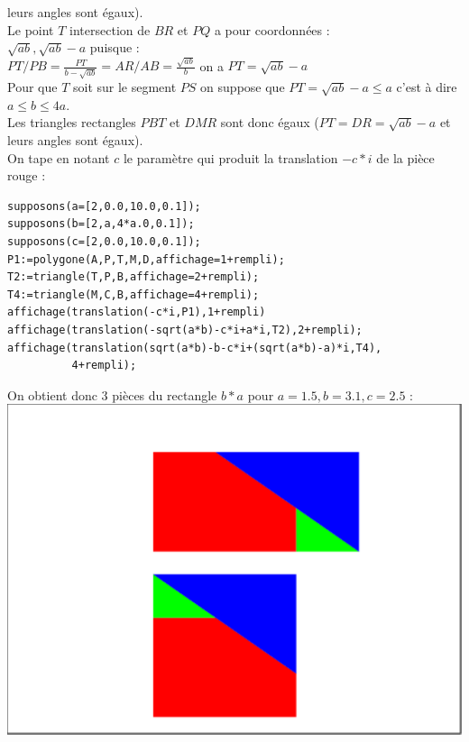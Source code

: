 \documentclass[a4paper,11pt]{book}
\begin{document}
leurs angles sont \'egaux).\\
Le point $T$ intersection de $BR$ et $PQ$ a pour coordonn\'ees :\\
$\sqrt{ab},\sqrt{ab} -a$ puisque :\\
$PT/PB=\frac{PT}{b-\sqrt{ab}}=AR/AB=\frac{\sqrt{ab}}{b}$
on a $PT=\sqrt{ab}-a$\\
Pour que  $T$ soit sur le segment $PS$ on suppose que $PT=\sqrt{ab}-a\leq a$
c'est \`a dire $a\leq b\leq 4a$.\\
Les triangles rectangles $PBT$ et $DMR$ sont donc \'egaux ($PT=DR=\sqrt{ab}-a$ 
et leurs angles sont \'egaux).\\
On tape en notant $c$ le param\`etre qui produit la translation 
$-c*i$ de la pi\`ece rouge :\\
\begin{verbatim}
supposons(a=[2,0.0,10.0,0.1]);
supposons(b=[2,a,4*a.0,0.1]);
supposons(c=[2,0.0,10.0,0.1]);
P1:=polygone(A,P,T,M,D,affichage=1+rempli);
T2:=triangle(T,P,B,affichage=2+rempli);
T4:=triangle(M,C,B,affichage=4+rempli);
affichage(translation(-c*i,P1),1+rempli)
affichage(translation(-sqrt(a*b)-c*i+a*i,T2),2+rempli);
affichage(translation(sqrt(a*b)-b-c*i+(sqrt(a*b)-a)*i,T4),
          4+rempli);
\end{verbatim}
On obtient donc 3 pi\`eces du rectangle $b*a$ pour $a=1.5,b=3.1,c=2.5$ :\\
\includegraphics[width=\textwidth]{carresqrta3}
\end{document}
